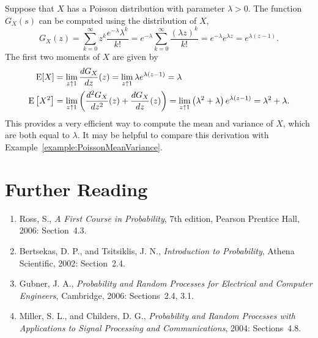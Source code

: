 \begin{example}
Suppose that $X$ has a Poisson distribution with parameter $\lambda > 0$.
The function $G_X(s)$ can be computed using the distribution of $X$,
\begin{equation*}
G_X(z) = \sum_{k = 0}^\infty z^{k} \frac{e^{-\lambda}\lambda^k}{k!}
= e^{-\lambda} \sum_{k = 0}^\infty \frac{(\lambda z)^k}{k!}
= e^{-\lambda} e^{\lambda z} = e^{\lambda(z - 1)} .
\end{equation*}
The first two moments of $X$ are given by
\begin{align*}
\mathrm{E} [X] &= \lim_{z \uparrow 1} \frac{d G_X}{dz} (z)
= \lim_{z \uparrow 1} \lambda e^{\lambda(z - 1)} = \lambda \\
\mathrm{E} \left[ X^2 \right] &= \lim_{z \uparrow 1}
\left( \frac{d^2 G_X}{dz^2} (z) + \frac{d G_X}{dz} (z) \right)
= \lim_{z \uparrow 1} \left( \lambda^2 + \lambda \right)
e^{\lambda (z - 1)} = \lambda^2 + \lambda .
\end{align*}
This provides a very efficient way to compute the mean and variance of $X$, which are both equal to $\lambda$.
It may be helpful to compare this derivation with Example~\ref{example:PoissonMeanVariance}.
\end{example}


\section*{Further Reading}

\begin{small}
\begin{enumerate}
\item Ross, S., \emph{A First Course in Probability}, 7th edition, Pearson Prentice Hall, 2006: Section~4.3.
\item Bertsekas, D. P., and Tsitsiklis, J. N., \emph{Introduction to Probability}, Athena Scientific, 2002: Section~2.4.
\item Gubner, J. A., \emph{Probability and Random Processes for Electrical and Computer Engineers}, Cambridge, 2006: Sections~2.4, 3.1.
\item Miller, S. L., and Childers, D. G., \emph{Probability and Random Processes with Applications to Signal Processing and Communications}, 2004: Sections~4.8.
\end{enumerate}
\end{small}

